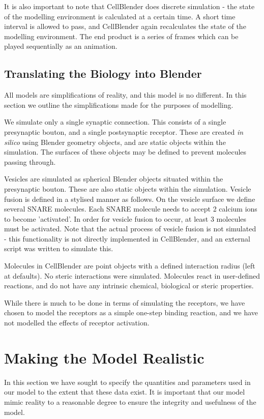 \documentclass[a4paper]{article}
\begin{document}
It is also important to note that CellBlender does discrete simulation - the state of the modelling environment is calculated at a certain time. A short time interval is allowed to pass, and CellBlender again recalculates the state of the modelling environment. The end product is a series of frames which can be played sequentially as an animation.

\subsection{Translating the Biology into Blender}
All models are simplifications of reality, and this model is no different. In this section we outline the simplifications made for the purposes of modelling.

We simulate only a single synaptic connection. This consists of a single presynaptic bouton, and a single postsynaptic receptor. These are created \textit{in silico} using Blender geometry objects, and are static objects within the simulation. The surfaces of these objects may be defined to prevent molecules passing through.

Vesicles are simulated as spherical Blender objects situated within the presynaptic bouton. These are also static objects within the simulation. Vesicle fusion is defined in a stylised manner as follows. On the vesicle surface we define several SNARE molecules. Each SNARE molecule needs to accept 2 calcium ions to become 'activated'. In order for vesicle fusion to occur, at least 3 molecules must be activated. Note that the actual process of vesicle fusion is not simulated - this functionality is not directly implemented in CellBlender, and an external script was written to simulate this.

Molecules in CellBlender are point objects with a defined interaction radius (left at defaults). No steric interactions were simulated. Molecules react in user-defined reactions, and do not have any intrinsic chemical, biological or steric properties. 

While there is much to be done in terms of simulating the receptors, we have chosen to model the receptors as a simple one-step binding reaction, and we have not modelled the effects of receptor activation.

\section{Making the Model Realistic}
In this section we have sought to specify the quantities and parameters used in our model to the extent that these data exist. It is important that our model mimic reality to a reasonable degree to ensure the integrity and usefulness of the model.
\end{document}
